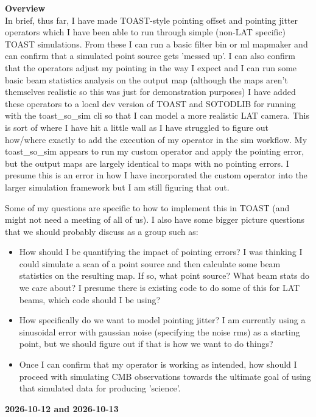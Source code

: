 {\bf Overview}\\
In brief, thus far, I have made TOAST-style pointing offset and pointing jitter operators which I have been able to run through simple (non-LAT specific) TOAST simulations. From these I can run a basic filter bin or ml mapmaker and can confirm that a simulated point source gets 'messed up'. I can also confirm that the operators adjust my pointing in the way I expect and I can run some basic beam statistics analysis on the output map (although the maps aren't themselves realistic so this was just for demonstration purposes)
I have added these operators to a local dev version of TOAST and SOTODLIB for running with the toast\_so\_sim cli so that I can model a more realistic LAT camera. This is sort of where I have hit a little wall as I have struggled to figure out how/where exactly to add the execution of my operator in the sim workflow. My toast\_so\_sim appears to run my custom operator and apply the pointing error, but the output maps are largely identical to maps with no pointing errors. I presume this is an error in how I have incorporated the custom operator into the larger simulation framework but I am still figuring that out. 

Some of my questions are specific to how to implement this in TOAST (and might not need a meeting of all of us). I also have some bigger picture questions that we should probably discuss as a group such as:

\begin{itemize}
    \item How should I be quantifying the impact of pointing errors? I was thinking I could simulate a scan of a point source and then calculate some beam statistics on the resulting map. If so, what point source? What beam stats do we care about? I presume there is existing code to do some of this for LAT beams, which code should I be using?
	\item How specifically do we want to model pointing jitter? I am currently using a sinusoidal error with gaussian noise (specifying the noise rms) as a starting point, but we should figure out if that is how we want to do things?
	\item Once I can confirm that my operator is working as intended, how should I proceed with simulating CMB observations towards the ultimate goal of using that simulated data for producing 'science'.
\end{itemize}

{\bf 2026-10-12 and 2026-10-13}\\

